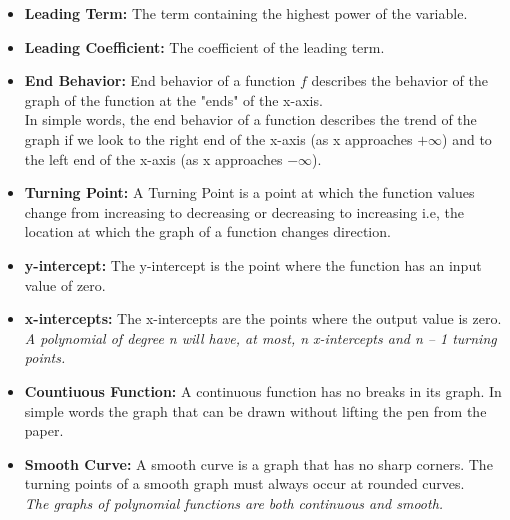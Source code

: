 \documentclass[12pt,a4paper]{article}
\begin{document}
\begin{itemize}
	\item \textbf{Leading Term:} The term containing the highest power of the variable.
	\item \textbf{Leading Coefficient:} The coefficient of the leading term.
	\item \textbf{End Behavior:} End behavior of a function $f$ describes the behavior of the graph of the function at the "ends" of the x-axis.\\
	In simple words, the end behavior of a function describes the trend of the graph if we look to the right end of the x-axis (as x approaches $+ \infty$) and to the left end of the x-axis (as x approaches $-\infty$).
	\item \textbf{Turning Point:} A Turning Point is a point at which the function values change from increasing to decreasing or decreasing to increasing i.e, the location at which the graph of a function changes direction.
	\item \textbf{y-intercept: }The y-intercept is the point where the function has an input value of zero.
	\item \textbf{x-intercepts:} The x-intercepts are the points where the output value is zero.\\
	\textit{A polynomial of degree n will have, at most, n x-intercepts and n – 1 turning points.}
	\item \textbf{Countiuous Function:} A continuous function has no breaks in its graph. In simple words the graph that can be drawn without lifting the pen from the paper. 
	\item \textbf{Smooth Curve:} A smooth curve is a graph that has no sharp corners. The turning points of a smooth graph must always occur at rounded curves.\\
	\textit{The graphs of polynomial functions are both continuous and smooth.}
\end{itemize}
 
\end{document}
